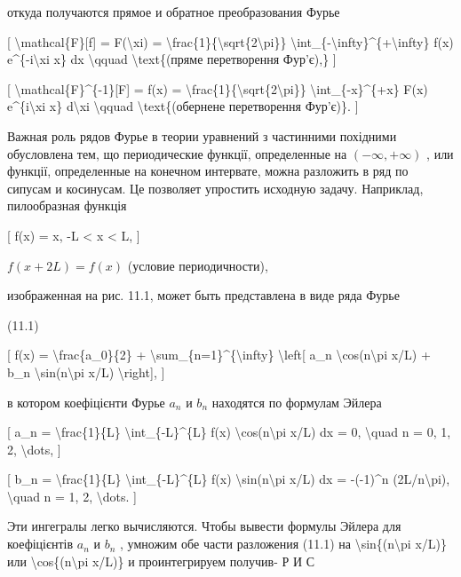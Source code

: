 \documentclass[
]{article}
\begin{document}
откуда получаются прямое и обратное преобразования Фурье

{[} \textbackslash mathcal\{F\}{[}f{]} = F(\textbackslash xi) =
\textbackslash frac\{1\}\{\textbackslash sqrt\{2\textbackslash pi\}\}
\textbackslash int\_\{-\textbackslash infty\}\^{}\{+\textbackslash infty\}
f(x) e\^{}\{-i\textbackslash xi x\} dx \textbackslash qquad
\textbackslash text\{(пряме перетворення Фур'є),\} {]}

{[} \textbackslash mathcal\{F\}\^{}\{-1\}{[}F{]} = f(x) =
\textbackslash frac\{1\}\{\textbackslash sqrt\{2\textbackslash pi\}\}
\textbackslash int\_\{-x\}\^{}\{+x\} F(x) e\^{}\{i\textbackslash xi x\}
d\textbackslash xi \textbackslash qquad \textbackslash text\{(обернене
перетворення Фур'є)\}. {]}

Важная роль рядов Фурье в теории уравнений з частинними похідними
обусловлена тем, що периодические функції, определенные на
\((-\infty, +\infty)\) , или функції, определенные на конечном
интервате, можна разложить в ряд по сипусам и косинусам. Це позволяет
упростить исходную задачу. Наприклад, пилообразная функція

{[} f(x) = x, -L \textless{} x \textless{} L, {]}

\(f(x + 2L) = f(x)\) (условие периодичности),

изображенная на рис. 11.1, может быть представлена в виде ряда Фурье

(11.1)

{[} f(x) = \textbackslash frac\{a\_0\}\{2\} +
\textbackslash sum\_\{n=1\}\^{}\{\textbackslash infty\}
\textbackslash left{[} a\_n \textbackslash cos(n\textbackslash pi x/L) +
b\_n \textbackslash sin(n\textbackslash pi x/L) \textbackslash right{]},
{]}

в котором коефіцієнти Фурье \(a_n\) и \(b_n\) находятся по формулам
Эйлера

{[} a\_n = \textbackslash frac\{1\}\{L\}
\textbackslash int\_\{-L\}\^{}\{L\} f(x)
\textbackslash cos(n\textbackslash pi x/L) dx = 0, \textbackslash quad n
= 0, 1, 2, \textbackslash dots, {]}

{[} b\_n = \textbackslash frac\{1\}\{L\}
\textbackslash int\_\{-L\}\^{}\{L\} f(x)
\textbackslash sin(n\textbackslash pi x/L) dx = -(-1)\^{}n
(2L/n\textbackslash pi), \textbackslash quad n = 1, 2,
\textbackslash dots. {]}

Эти ингегралы легко вычисляются. Чтобы вывести формулы Эйлера для
коефіцієнтів \(a_n\) и \(b_n\) , умножим обе части разложения (11.1) на
\textbackslash sin\{(n\textbackslash pi x/L)\} или
\textbackslash cos\{(n\textbackslash pi x/L)\} и проинтегрируем получив-
Р И С
\end{document}

